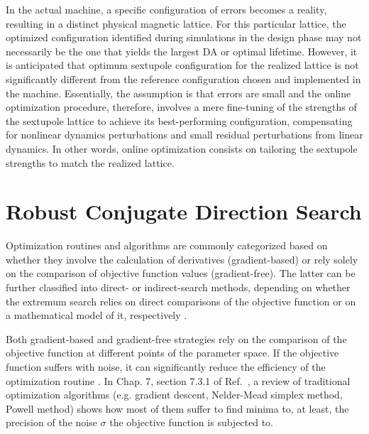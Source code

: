In the actual machine, a specific configuration of errors becomes a reality, resulting in a distinct physical magnetic lattice. For this particular lattice, the optimized configuration identified during simulations in the design phase may not necessarily be the one that yields the largest DA or optimal lifetime. However, it is anticipated that optimum sextupole configuration for the realized lattice is not significantly different from the reference configuration chosen and implemented in the machine. Essentially, the assumption is that errors are small and the online optimization procedure, therefore, involves a mere fine-tuning of the strengths of the sextupole lattice to achieve its best-performing configuration, compensating for nonlinear dynamics perturbations and small residual perturbations from linear dynamics. In other words, online optimization consists on tailoring the sextupole strengths to match the realized lattice.

\section{Robust Conjugate Direction Search}
Optimization routines and algorithms are commonly categorized based on whether they involve the calculation of derivatives (gradient-based) or rely solely on the comparison of objective function values (gradient-free). The latter can be further classified into direct- or indirect-search methods, depending on whether the extremum search relies on direct comparisons of the objective function or on a mathematical model of it, respectively \cite{press_numerical_2007}.

Both gradient-based and gradient-free strategies rely on the comparison of the objective function at different points of the parameter space. If the objective function suffers with noise, it can significantly reduce the efficiency of the optimization routine \cite{press_numerical_2007, huang_beam-based_2019}. In Chap. 7, section 7.3.1 of Ref.~\cite{huang_beam-based_2019}, a review of traditional optimization algorithms (e.g. gradient descent, Nelder-Mead simplex method, Powell method) shows how most of them suffer to find minima to, at least, the precision of the noise $\sigma$ the objective function is subjected to.

